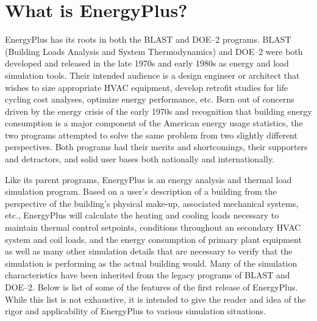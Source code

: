 \section{What is EnergyPlus?}\label{what-is-energyplus}

EnergyPlus has its roots in both the BLAST and DOE--2 programs. BLAST (Building Loads Analysis and System Thermodynamics) and DOE--2 were both developed and released in the late 1970s and early 1980s as energy and load simulation tools. Their intended audience is a design engineer or architect that wishes to size appropriate HVAC equipment, develop retrofit studies for life cycling cost analyses, optimize energy performance, etc. Born out of concerns driven by the energy crisis of the early 1970s and recognition that building energy consumption is a major component of the American energy usage statistics, the two programs attempted to solve the same problem from two slightly different perspectives. Both programs had their merits and shortcomings, their supporters and detractors, and solid user bases both nationally and internationally.

Like its parent programs, EnergyPlus is an energy analysis and thermal load simulation program. Based on a user's description of a building from the perspective of the building's physical make-up, associated mechanical systems, etc., EnergyPlus will calculate the heating and cooling loads necessary to maintain thermal control setpoints, conditions throughout an secondary HVAC system and coil loads, and the energy consumption of primary plant equipment as well as many other simulation details that are necessary to verify that the simulation is performing as the actual building would. Many of the simulation characteristics have been inherited from the legacy programs of BLAST and DOE--2. Below is list of some of the features of the first release of EnergyPlus. While this list is not exhaustive, it is intended to give the reader and idea of the rigor and applicability of EnergyPlus to various simulation situations.

